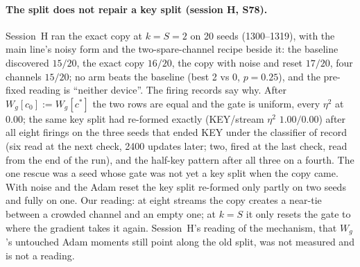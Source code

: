 \documentclass[11pt]{article}
\begin{document}
\paragraph{The split does not repair a key split (session H, S78).} Session~H ran the exact copy at $k = S = 2$ on 20 seeds (1300--1319), with the main line's noisy form and the two-spare-channel recipe beside it: the baseline discovered $15/20$, the exact copy $16/20$, the copy with noise and reset $17/20$, four channels $15/20$; no arm beats the baseline (best 2 vs 0, $p = 0.25$), and the pre-fixed reading is ``neither device''. The firing records say why. After $W_g[c_0] := W_g[c^*]$ the two rows are equal and the gate is uniform, every $\eta^2$ at $0.00$; the same key split had re-formed exactly (KEY/stream $\eta^2$ $1.00/0.00$) after all eight firings on the three seeds that ended KEY under the classifier of record (six read at the next check, 2400 updates later; two, fired at the last check, read from the end of the run), and the half-key pattern after all three on a fourth. The one rescue was a seed whose gate was not yet a key split when the copy came. With noise and the Adam reset the key split re-formed only partly on two seeds and fully on one. Our reading: at eight streams the copy creates a near-tie between a crowded channel and an empty one; at $k = S$ it only resets the gate to where the gradient takes it again. Session~H's reading of the mechanism, that $W_g$'s untouched Adam moments still point along the old split, was not measured and is not a reading.
\end{document}
